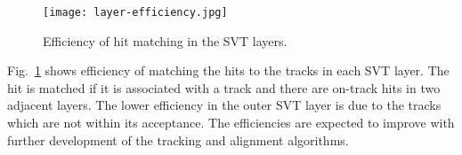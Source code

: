 \begin{figure}[hbt] 
\centering 
\texttt{[image: layer-efficiency.jpg]}
\caption{Efficiency of hit matching in the SVT layers.}
\label{fig:layer-efficiency}
\end{figure}

Fig.~\ref{fig:layer-efficiency} shows efficiency of matching the hits to the tracks in each SVT layer. The hit is matched if it is associated with a track and there are on-track hits in two adjacent layers. The lower efficiency in the outer SVT layer is due to the tracks which are not within its acceptance. The efficiencies are expected to improve with further development of the tracking and alignment algorithms. 
